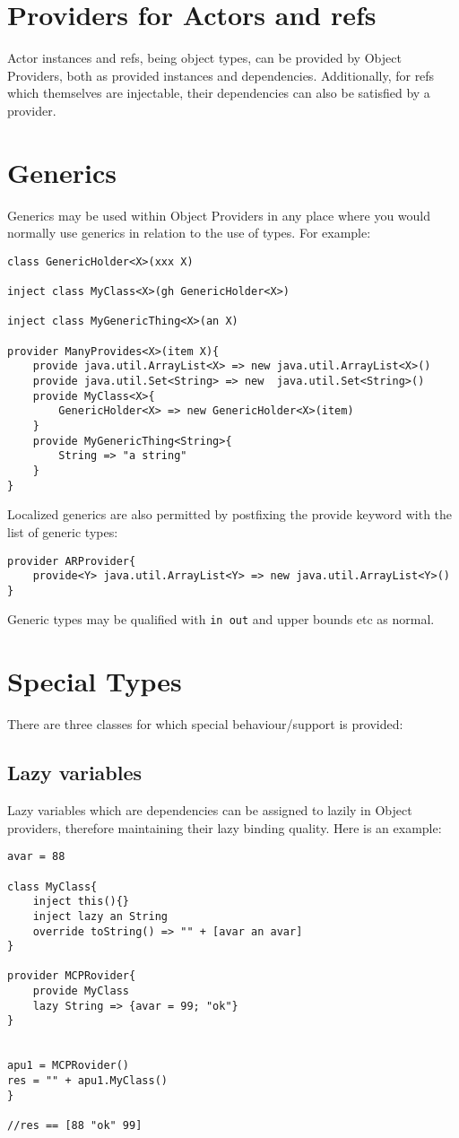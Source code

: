 \documentclass[conc-doc]{subfiles}
\begin{document}
\section{Providers for Actors and refs}
Actor instances and refs, being object types, can be provided by Object Providers, both as provided instances and dependencies. Additionally, for refs which themselves are injectable, their dependencies can also be satisfied by a provider.

\section{Generics}
Generics may be used within Object Providers in any place where you would normally use generics in relation to the use of types. For example:
\begin{lstlisting}
class GenericHolder<X>(xxx X)

inject class MyClass<X>(gh GenericHolder<X>)

inject class MyGenericThing<X>(an X)

provider ManyProvides<X>(item X){
	provide java.util.ArrayList<X> => new java.util.ArrayList<X>()
	provide java.util.Set<String> => new  java.util.Set<String>()
	provide MyClass<X>{	
		GenericHolder<X> => new GenericHolder<X>(item)
	}
	provide MyGenericThing<String>{
		String => "a string"
	}
}
\end{lstlisting}

Localized generics are also permitted by postfixing the provide keyword with the list of generic types:
\begin{lstlisting}
provider ARProvider{
	provide<Y> java.util.ArrayList<Y> => new java.util.ArrayList<Y>()
}
\end{lstlisting}

Generic types may be qualified with \lstinline{in out} and upper bounds etc as normal.

\section{Special Types}
There are three classes for which special behaviour/support is provided:

\subsection{Lazy variables}
Lazy variables which are dependencies can be assigned to lazily in Object providers, therefore maintaining their lazy binding quality. Here is an example:
\begin{lstlisting}
avar = 88

class MyClass{
	inject this(){}
	inject lazy an String
	override toString() => "" + [avar an avar]
}

provider MCPRovider{
	provide MyClass
	lazy String => {avar = 99; "ok"}
}


apu1 = MCPRovider()
res = "" + apu1.MyClass()
}

//res == [88 "ok" 99]
\end{lstlisting}
\end{document}
